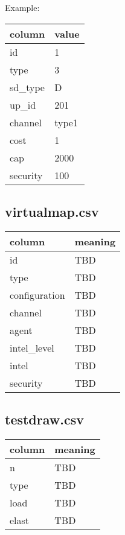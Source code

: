 \documentclass[12pt]{article}
\begin{document}
\bigskip
\noindent
Example:

\bigskip
\noindent
\begin{tabular} {| l | l |}
    \hline
    \textbf{column} & \textbf{value} \\ \hline
    id & 1 \\ \hline
    type & 3 \\ \hline
    sd\_type & D \\ \hline
    up\_id & 201 \\ \hline
    channel & type1 \\ \hline
    cost & 1 \\ \hline
    cap & 2000 \\ \hline
    security & 100 \\ \hline
\end{tabular}

\subsection{virtualmap.csv}

\begin{tabular} {| l | l |}
    \hline
    \textbf{column} & \textbf{meaning} \\ \hline
    id & TBD \\ \hline
    type & TBD \\ \hline
    configuration & TBD \\ \hline
    channel & TBD \\ \hline
    agent & TBD \\ \hline
    intel\_level & TBD \\ \hline
    intel & TBD \\ \hline
    security & TBD \\ \hline
\end{tabular}

\subsection{testdraw.csv}

\begin{tabular} {| l | l |}
    \hline
    \textbf{column} & \textbf{meaning} \\ \hline
    n & TBD \\ \hline
    type & TBD \\ \hline
    load & TBD \\ \hline
    elast & TBD \\ \hline
\end{tabular}
\end{document}
